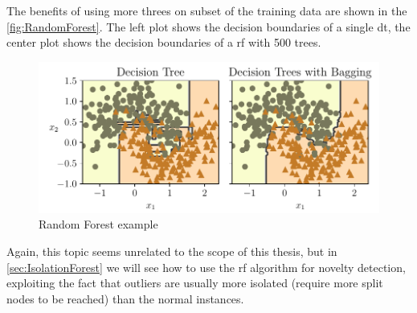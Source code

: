 The benefits of using more threes on subset of the training data are shown in the \autoref{fig:RandomForest}. The left plot shows the decision boundaries of a single \gls{dt}, the center plot shows the decision boundaries of a \gls{rf} with 500 trees.

\begin{figure}
    \centering
    \includegraphics{images/MachineLearning/RandomForest.pdf}
    \caption{Random Forest example }
    \label{fig:RandomForest}
\end{figure}

Again, this topic seems unrelated to the scope of this thesis, but in \autoref{sec:IsolationForest} we will see how to use the \gls{rf} algorithm for novelty detection, exploiting the fact that outliers are usually more isolated (require more split nodes to be reached) than the normal instances.